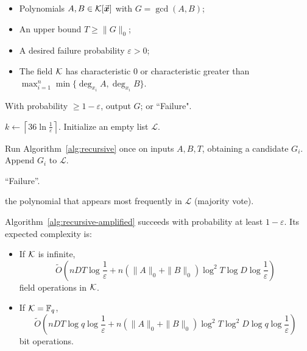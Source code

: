 \documentclass{article}
\numberwithin{equation}{section}
\begin{document}
\begin{algorithm}
\caption{Recursive GCD Algorithm (Amplified)}
\label{alg:recursive-amplified}
\begin{algorithmic}[1]
\Require
    \begin{itemize}
        \item Polynomials $A, B \in {\mathcal{K}}[\vec{\boldsymbol{x}}]$ with $G = \gcd(A,B)$;
        \item An upper bound $T\ge \|G\|_0$;
        \item A desired failure probability $\varepsilon > 0$;
        \item The field ${\mathcal{K}}$ has characteristic $0$ or characteristic greater than $\max_{i=1}^n\min\{\deg_{x_i} A,\deg_{x_i} B\}$.
    \end{itemize}
\Ensure
    With probability $\ge 1-\varepsilon$, output $G$; or ``Failure".

\State $k \gets \left\lceil 36 \ln\frac{1}{\varepsilon} \right\rceil$.
\State Initialize an empty list $\mathcal{L}$.

    \State Run Algorithm~\ref{alg:recursive} once on inputs $A, B, T$, obtaining a candidate $G_i$.
        \State Append $G_i$ to $\mathcal{L}$.
    \EndIf
\EndFor

    \State \Return ``Failure''.
\EndIf

\State \Return the polynomial that appears most frequently in $\mathcal{L}$ (majority vote).
\end{algorithmic}
\end{algorithm}

\begin{theorem}\label{rem-ampl-com}
Algorithm~\ref{alg:recursive-amplified} succeeds with probability at least \(1-\varepsilon\). Its expected complexity is:

\begin{itemize}
    \item If ${\mathcal{K}}$ is infinite,
   \[
\widetilde{O}\!\left( n D T \log \frac{1}{\varepsilon}
+ n(\|A\|_0 + \|B\|_0) \log^2 T \log D \log \frac{1}{\varepsilon}
\right)
\]
    field operations in ${\mathcal{K}}$.

    \item If ${\mathcal{K}} = \mathbb{F}_q$,
   \[
\widetilde{O}\!\left(
n D T \log q \log \frac{1}{\varepsilon}
+ n(\|A\|_0 + \|B\|_0) \log^2 T \log^2 D \log q \log \frac{1}{\varepsilon}
\right)
\]
    bit operations.
\end{itemize}
\end{theorem}
\end{document}
